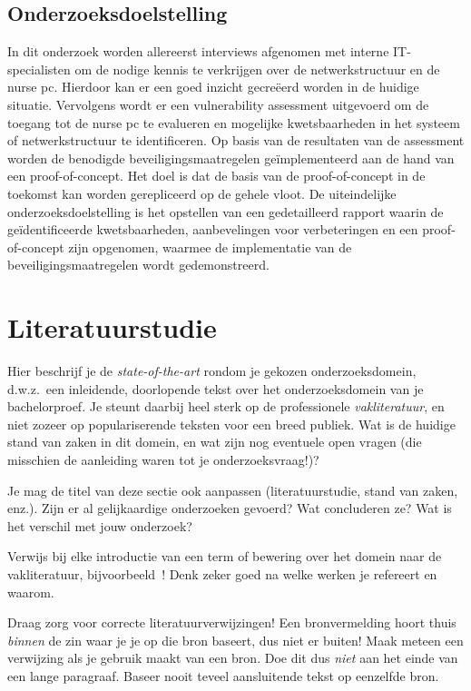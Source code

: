 \subsection{Onderzoeksdoelstelling}
In dit onderzoek worden allereerst interviews afgenomen met interne IT-specialisten om de nodige kennis te verkrijgen over de netwerkstructuur en de nurse pc. Hierdoor kan er een goed inzicht gecreëerd worden in de huidige situatie. 
Vervolgens wordt er een vulnerability assessment uitgevoerd om de toegang tot de nurse pc te evalueren en mogelijke kwetsbaarheden in het systeem of netwerkstructuur te identificeren.
Op basis van de resultaten van de assessment worden de benodigde beveiligingsmaatregelen geïmplementeerd aan de hand van een proof-of-concept. Het doel is dat de basis van de proof-of-concept in de toekomst kan worden gerepliceerd op de gehele vloot.
De uiteindelijke onderzoeksdoelstelling is het opstellen van een gedetailleerd rapport waarin de geïdentificeerde kwetsbaarheden, aanbevelingen voor verbeteringen en een proof-of-concept zijn opgenomen, waarmee de implementatie van de beveiligingsmaatregelen wordt 
gedemonstreerd. 


\section{Literatuurstudie}%
\label{sec:literatuurstudie}

Hier beschrijf je de \emph{state-of-the-art} rondom je gekozen onderzoeksdomein, d.w.z.\ een inleidende, doorlopende tekst over het onderzoeksdomein van je bachelorproef. Je steunt daarbij heel sterk op de professionele \emph{vakliteratuur}, en niet zozeer op populariserende teksten voor een breed publiek. Wat is de huidige stand van zaken in dit domein, en wat zijn nog eventuele open vragen (die misschien de aanleiding waren tot je onderzoeksvraag!)?

Je mag de titel van deze sectie ook aanpassen (literatuurstudie, stand van zaken, enz.). Zijn er al gelijkaardige onderzoeken gevoerd? Wat concluderen ze? Wat is het verschil met jouw onderzoek?

Verwijs bij elke introductie van een term of bewering over het domein naar de vakliteratuur, bijvoorbeeld~\autocite{Hykes2013}! Denk zeker goed na welke werken je refereert en waarom.

Draag zorg voor correcte literatuurverwijzingen! Een bronvermelding hoort thuis \emph{binnen} de zin waar je je op die bron baseert, dus niet er buiten! Maak meteen een verwijzing als je gebruik maakt van een bron. Doe dit dus \emph{niet} aan het einde van een lange paragraaf. Baseer nooit teveel aansluitende tekst op eenzelfde bron.

